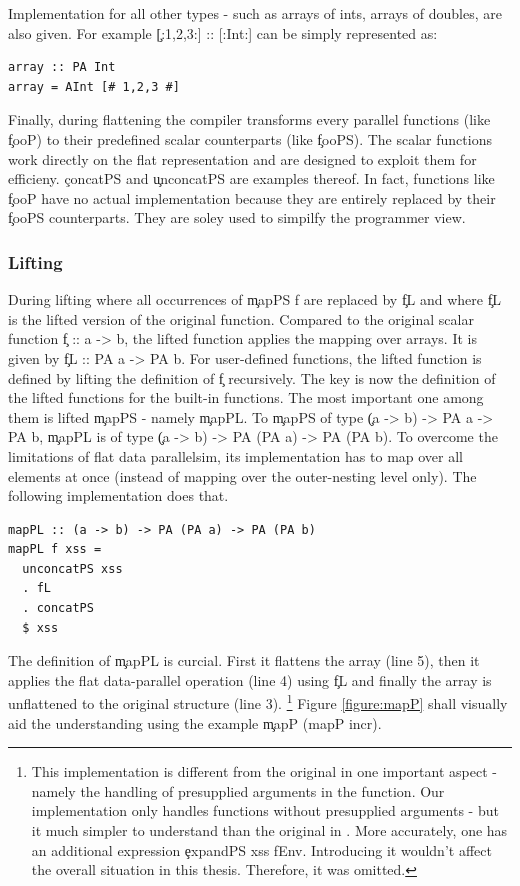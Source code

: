       
      Implementation for all other types - such as arrays of ints,
      arrays of doubles, are also given. For example \c{[:1,2,3:] :: [:Int:]} can be simply
      represented as:
      \begin{lstlisting}
array :: PA Int
array = AInt [# 1,2,3 #]
      \end{lstlisting}
      
      Finally, during flattening the compiler transforms
      every parallel functions (like \c{fooP}) to
      their predefined scalar counterparts (like \c{fooPS}).
      The scalar functions work directly on the flat representation
      and are designed to exploit them for efficieny.
      \c{concatPS} and \c{unconcatPS} are examples thereof.
      In fact, functions like \c{fooP} have no actual implementation
      because they are entirely replaced by their \c{fooPS} counterparts.
      They are soley used to simpilfy the programmer view.
    
      
    \subsubsection{Lifting}
      During lifting where all occurrences of \c{mapPS f} are
      replaced by \c{fL} and where \c{fL}
      is the lifted version of the original function.
      Compared to the original scalar function \c{f :: a -> b}, the lifted
      function applies the mapping over arrays. It is given by \c{fL :: PA a -> PA b}.
      For user-defined functions, the lifted function is defined by lifting the definition of \c{f} recursively.
      The key is now the definition of the lifted functions for the built-in functions.
      The most important one among them is lifted \c{mapPS} - namely \c{mapPL}.
      To \c{mapPS} of type \c{(a -> b) -> PA a -> PA b},
      \c{mapPL} is of type \c{(a -> b) -> PA (PA a) -> PA (PA b)}.
      To overcome the limitations of flat data parallelsim,
      its implementation has to map over all elements at once
      (instead of mapping over the outer-nesting level only).
      The following implementation does that.
    \begin{lstlisting}
mapPL :: (a -> b) -> PA (PA a) -> PA (PA b)
mapPL f xss =
  unconcatPS xss
  . fL
  . concatPS
  $ xss
    \end{lstlisting}
    The definition of \c{mapPL} is curcial.
    First it flattens the array (line 5), then it applies
    the flat data-parallel operation (line 4) using \c{fL}
    and finally the array is unflattened to the original structure (line 3).
    \footnote{This implementation is different from the original in one important aspect - 
    namely the handling of presupplied arguments in the function. Our
    implementation only handles functions without presupplied arguments -
    but it much simpler to understand than the original in \cite{Harness2008}.
    More accurately, one has an additional expression \c{expandPS xss fEnv}.
    Introducing it wouldn't affect the overall situation in this thesis.
    Therefore, it was omitted.
    }
    Figure \ref{figure:mapP} shall visually aid the understanding
    using the example \c{mapP (mapP incr)}.
    
